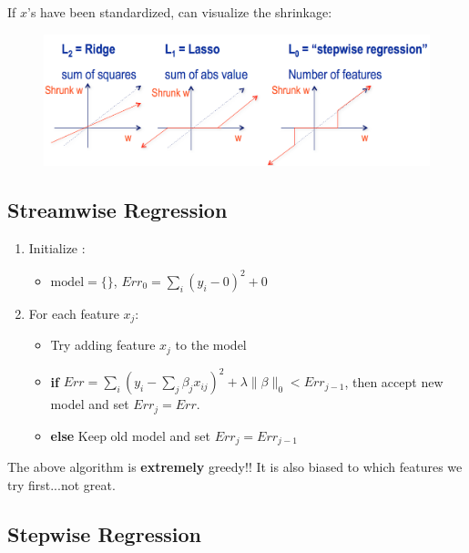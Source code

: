 \documentclass[a4paper]{article}\usepackage[]{graphicx}\usepackage[]{color}
\begin{document}
If $x$'s have been standardized, can visualize the shrinkage:
\begin{figure}[H]
\centering
\includegraphics[width=5in]{regular_penalty.png}
\end{figure}


\subsection{Streamwise Regression}

\begin{enumerate}
\item Initialize :
\begin{itemize}
\item $\text{model} = \{\}$, $Err_0 = \sum_i (y_i-0)^2 + 0$
\end{itemize}

\item For each feature $x_j$:
\begin{itemize}
\item Try adding feature $x_j$ to the model
\item \textbf{if} $Err = \sum_i (y_i -\sum_j \beta_j x_{ij})^2 + \lambda \lVert \beta \rVert_0 < Err_{j-1}$, then accept new model and set $Err_j = Err$.
\item \textbf{else} Keep old model and set $Err_j = Err_{j-1}$
\end{itemize}
\end{enumerate}

The above algorithm is \textbf{extremely} greedy!! It is also biased to which features we try first...not great. 

\subsection{Stepwise Regression}
\end{document}

